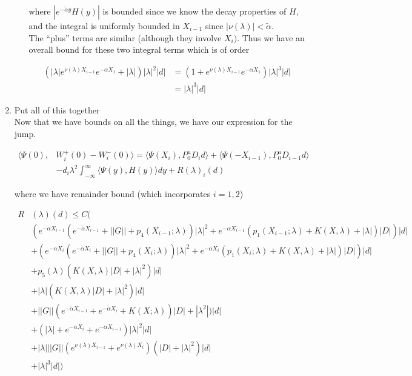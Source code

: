 \documentclass[12pt]{article}
\begin{document}
\begin{enumerate}
\begin{enumerate}
where $|e^{-\tilde{\alpha} y} H(y)|$ is bounded since we know the decay properties of $H$, and the integral is uniformly bounded in $X_{i-1}$ since $|\nu(\lambda)| < \tilde{\alpha}$. \\

The ``plus'' terms are similar (although they involve $X_i)$. Thus we have an overall bound for these two integral terms which is of order

\begin{align*}
(|\lambda| e^{\nu(\lambda)X_{i-1}} e^{-\alpha X_1} + |\lambda|)|\lambda|^2 |d|
&= (1 + e^{\nu(\lambda)X_{i-1}} e^{-\alpha X_1})|\lambda|^3 |d| \\
&= |\lambda|^3 |d|
\end{align*}

\end{enumerate}


\item Put all of this together\\

Now that we have bounds on all the things, we have our expression for the jump.

\begin{align*}
\langle \Psi(0), &W_i^+(0) - W_i^-(0) \rangle = 
\langle \Psi(X_i), P^u_0 D_i d \rangle + \langle \Psi(-X_{i-1}), P^u_0 D_{i-1} d \rangle \\
&- d_i \lambda^2 \int_{-\infty}^\infty \langle \Psi(y), H(y) \rangle dy + R(\lambda)_i(d)
\end{align*}

where we have remainder bound (which incorporates $i = 1, 2$)

\begin{align*}
R&(\lambda)(d) \leq C \Big( \\
&(e^{-\alpha X_{i-1}}(e^{-\tilde{\alpha} X_{i-1}} + ||G|| + p_4(X_{i-1}; \lambda))|\lambda|^2 + e^{-\alpha X_{i-1}}(p_1(X_{i-1}; \lambda) + K(X, \lambda) + |\lambda|) |D|)|d| \\
&+(e^{-\alpha X_i}(e^{-\tilde{\alpha} X_i} + ||G|| + p_4(X_i; \lambda))|\lambda|^2 + e^{-\alpha X_i}(p_1(X_i; \lambda) + K(X, \lambda) + |\lambda|) |D|)|d|\\
&+ p_5(\lambda) ( K(X, \lambda) |D|+ |\lambda|^2 )|d| \\
&+ |\lambda| ( K(X, \lambda) |D|+ |\lambda|^2 )|d| \\
&+ ||G|| ( e^{-\tilde{\alpha} X_{i-1}} + e^{-\tilde{\alpha} X_i} + K(X; \lambda))|D| + |\lambda^2|)|d| \\
&+ ( |\lambda| + e^{-\alpha X_i} + e^{-\alpha X_{i-1}} ) |\lambda|^2 |d| \\
&+ |\lambda| ||G|| (e^{\nu(\lambda)X_{i-1}} + e^{\nu(\lambda)X_i})(|D| + |\lambda|^2 )|d|  \\
&+ |\lambda|^3 |d| \Big)
\end{align*}


\end{enumerate}
\end{document}
